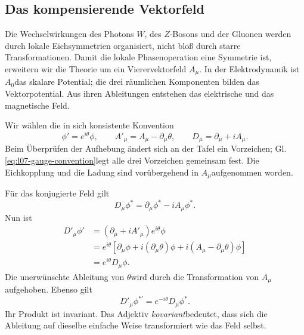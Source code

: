 \subsection{Das kompensierende Vektorfeld}

Die Wechselwirkungen des Photons \(W\), des \(Z\)-Bosons und der Gluonen werden durch lokale Eichsymmetrien organisiert, nicht bloß durch starre Transformationen. Damit die lokale Phasenoperation eine Symmetrie ist, erweitern wir die Theorie um ein Vierervektorfeld \(A_\mu\). In der Elektrodynamik ist \(A_0\)das skalare Potential; die drei räumlichen Komponenten bilden das Vektorpotential. Aus ihren Ableitungen entstehen das elektrische und das magnetische Feld.

Wir wählen die in sich konsistente Konvention
\begin{equation}
  \phi'=e^{i\theta}\phi,
  \qquad
  A'_\mu=A_\mu-\partial_\mu\theta,
  \qquad
  D_\mu=\partial_\mu+iA_\mu.
  \label{eq:l07-gauge-convention}
\end{equation}
Beim Überprüfen der Aufhebung ändert sich an der Tafel ein Vorzeichen; Gl. \eqref{eq:l07-gauge-convention}legt alle drei Vorzeichen gemeinsam fest. Die Eichkopplung und die Ladung sind vorübergehend in \(A_\mu\)aufgenommen worden.

Für das konjugierte Feld gilt
\begin{equation}
  D_\mu\phi^*=\partial_\mu\phi^*-iA_\mu\phi^*.
\end{equation}
Nun ist
\begin{align}
  D'_\mu\phi'
  &=
  \left(\partial_\mu+iA'_\mu\right)e^{i\theta}\phi
  \nonumber\\
  &=
  e^{i\theta}
  \left[
    \partial_\mu\phi+i(\partial_\mu\theta)\phi
    +i(A_\mu-\partial_\mu\theta)\phi
  \right]
  \nonumber\\
  &=e^{i\theta}D_\mu\phi.
  \label{eq:l07-covariant-transform}
\end{align}
Die unerwünschte Ableitung von \(\theta\)wird durch die Transformation von \(A_\mu\)aufgehoben. Ebenso gilt
\begin{equation}
  D'_\mu\phi^{*\prime}=e^{-i\theta}D_\mu\phi^*.
\end{equation}
Ihr Produkt ist invariant. Das Adjektiv \emph{kovariant}bedeutet, dass sich die Ableitung auf dieselbe einfache Weise transformiert wie das Feld selbst.

